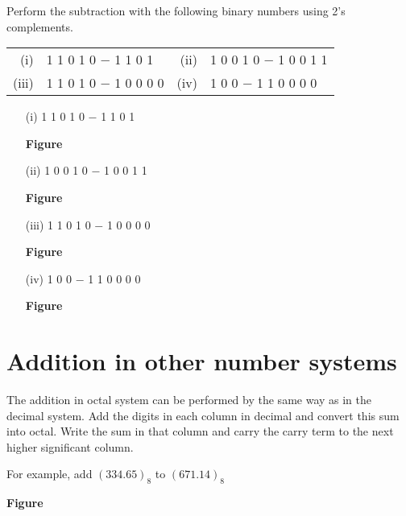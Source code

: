 \begin{problem}\label{prob5.31}
Perform the subtraction with the following binary numbers using 2's complements.
\begin{center}
\begin{tabular}{r@{\;\,}l@{\qquad\quad}r@{\;\,}l}
(i) & 1 1 0 1 0 $-$ 1 1 0 1 & (ii) & 1 0 0 1 0 $-$ 1 0 0 1 1\\[3pt]
(iii) & 1 1 0 1 0 $-$ 1 0 0 0 0 & (iv) & 1 0 0 $-$ 1 1 0 0 0 0
\end{tabular}
\end{center}
\end{problem}

\begin{solution}
\begin{itemize}
\item[(i)] 1 1 0 1 0 $-$ 1 1 0 1
\begin{center}
{\bf Figure}
\end{center}

\item[(ii)] 1 0 0 1 0 $-$ 1 0 0 1 1
\begin{center}
{\bf Figure}
\end{center}

\item[(iii)] 1 1 0 1 0 $-$ 1 0 0 0 0
\begin{center}
{\bf Figure}
\end{center}

\item[(iv)] 1 0 0 $-$ 1 1 0 0 0 0
\begin{center}
{\bf Figure}
\end{center}
\end{itemize}
\end{solution}

\section{Addition in other number systems}\label{sec7.7}


The addition in octal system can be performed by the same way as in the decimal system. Add the digits in each column in decimal and convert this sum into octal. Write the sum in that column and carry the carry term to the next higher significant column.

For example, add $(334.65)_{8}$ to $(671.14)_{8}$
\begin{center}
{\bf Figure}
\end{center}

